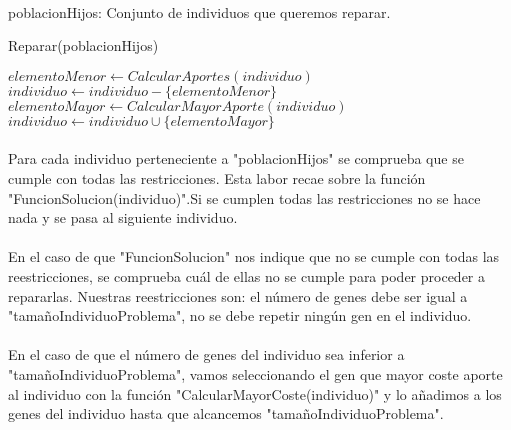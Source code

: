 	\paragraph{}poblacionHijos: Conjunto de individuos que queremos reparar.

	\begin{algorithm}[H]
		\caption{Reparar(poblacionHijos)}
		\begin{algorithmic}
			
			\STATE $elementoMenor \leftarrow CalcularAportes(individuo)$
			\STATE $individuo \leftarrow individuo-\{elementoMenor\}$
			\ENDWHILE
			\STATE $elementoMayor \leftarrow CalcularMayorAporte(individuo)$
			\STATE $individuo \leftarrow individuo\cup\{elementoMayor\}$
			\ENDIF
			\ENDIF
			\ENDFOR
		\end{algorithmic}
	\end{algorithm}

	\paragraph{}Para cada individuo perteneciente a "poblacionHijos" se comprueba que se cumple con todas las restricciones. Esta labor recae sobre la función "FuncionSolucion(individuo)".Si se cumplen todas las restricciones no se hace nada y se pasa al siguiente individuo.
	
	\paragraph{}En el caso de que "FuncionSolucion" nos indique que no se cumple con todas las reestricciones, se comprueba cuál de ellas no se cumple para poder proceder a repararlas.
	Nuestras reestricciones son: el número de genes debe ser igual a "tamañoIndividuoProblema", no se debe repetir ningún gen en el individuo.
	
	\paragraph{}En el caso de que el número de genes del individuo sea inferior a "tamañoIndividuoProblema", vamos seleccionando el gen que mayor coste aporte al individuo con la función "CalcularMayorCoste(individuo)" y lo añadimos a los genes del individuo hasta que alcancemos "tamañoIndividuoProblema".
	
